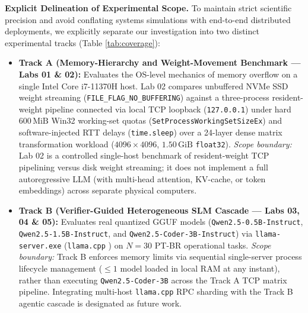 \documentclass[10pt,a4paper]{article}
\begin{document}
\textbf{Explicit Delineation of Experimental Scope.} To maintain strict scientific precision and avoid conflating systems simulations with end-to-end distributed deployments, we explicitly separate our investigation into two distinct experimental tracks (Table \ref{tab:coverage}):
\begin{itemize}
    \item \textbf{Track A (Memory-Hierarchy and Weight-Movement Benchmark — Labs 01 \& 02):} Evaluates the OS-level mechanics of memory overflow on a single Intel Core i7-11370H host. Lab 02 compares unbuffered NVMe SSD weight streaming (\texttt{FILE\_FLAG\_NO\_BUFFERING}) against a three-process resident-weight pipeline connected via local TCP loopback (\texttt{127.0.0.1}) under hard $600\,\text{MiB}$ Win32 working-set quotas (\texttt{SetProcessWorkingSetSizeEx}) and software-injected RTT delays (\texttt{time.sleep}) over a 24-layer dense matrix transformation workload ($4096 \times 4096$, $1.50\,\text{GiB}$ \texttt{float32}). \emph{Scope boundary:} Lab 02 is a controlled single-host benchmark of resident-weight TCP pipelining versus disk weight streaming; it does not implement a full autoregressive LLM (with multi-head attention, KV-cache, or token embeddings) across separate physical computers.
    \item \textbf{Track B (Verifier-Guided Heterogeneous SLM Cascade — Labs 03, 04 \& 05):} Evaluates real quantized GGUF models (\texttt{Qwen2.5-0.5B-Instruct}, \texttt{Qwen2.5-1.5B-Instruct}, and \texttt{Qwen2.5-Coder-3B-Instruct}) via \texttt{llama-server.exe} (\texttt{llama.cpp} \cite{gerganov2023llamacpp}) on $N=30$ PT-BR operational tasks. \emph{Scope boundary:} Track B enforces memory limits via sequential single-server process lifecycle management ($\le 1$ model loaded in local RAM at any instant), rather than executing \texttt{Qwen2.5-Coder-3B} across the Track A TCP matrix pipeline. Integrating multi-host \texttt{llama.cpp} RPC sharding with the Track B agentic cascade is designated as future work.
\end{itemize}
\end{document}
